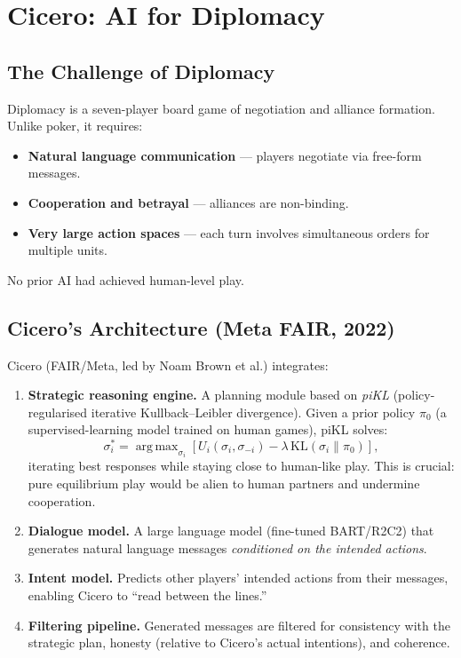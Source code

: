 \documentclass[11pt,a4paper]{article}
\theoremstyle{plain}
\theoremstyle{definition}
\newcommand{\KL}{\mathrm{KL}}
\DeclareMathOperator*{\argmax}{arg\,max}
\begin{document}
\section{Cicero: AI for Diplomacy}\label{sec:cicero}

\subsection{The Challenge of Diplomacy}

Diplomacy is a seven-player board game of negotiation and alliance
formation.  Unlike poker, it requires:
\begin{itemize}
  \item \textbf{Natural language communication} --- players negotiate via
    free-form messages.
  \item \textbf{Cooperation and betrayal} --- alliances are non-binding.
  \item \textbf{Very large action spaces} --- each turn involves
    simultaneous orders for multiple units.
\end{itemize}
No prior AI had achieved human-level play.

\subsection{Cicero's Architecture (Meta FAIR, 2022)}

Cicero (FAIR/Meta, led by Noam Brown et al.) integrates:

\begin{enumerate}
  \item \textbf{Strategic reasoning engine.}  A planning module based on
    \emph{piKL} (policy-regularised iterative Kullback--Leibler
    divergence).  Given a prior policy $\pi_0$ (a supervised-learning
    model trained on human games), piKL solves:
    \[
      \sigma_i^* = \argmax_{\sigma_i} \left[
        U_i(\sigma_i, \sigma_{-i})
        - \lambda\, \KL(\sigma_i \| \pi_0)
      \right],
    \]
    iterating best responses while staying close to human-like play.
    This is crucial: pure equilibrium play would be alien to human
    partners and undermine cooperation.

  \item \textbf{Dialogue model.}  A large language model (fine-tuned
    BART/R2C2) that generates natural language messages \emph{conditioned
    on the intended actions}.

  \item \textbf{Intent model.}  Predicts other players' intended actions
    from their messages, enabling Cicero to ``read between the lines.''

  \item \textbf{Filtering pipeline.}  Generated messages are filtered
    for consistency with the strategic plan, honesty (relative to
    Cicero's actual intentions), and coherence.
\end{enumerate}
\end{document}
